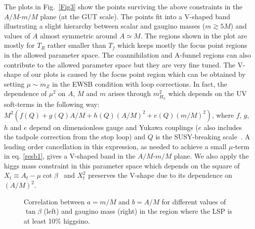 \documentclass[12pt,a4paper]{book}
\begin{document}
The plots in Fig.~\ref{Fig3} show the points surviving the above constraints in the $A/M$-$m/M$ plane (at the GUT scale). The points fit into a V-shaped band illustrating a slight hierarchy between scalar and gaugino masses ($m\gtrsim 5 M$) and values of $A$ almost symmetric around $A\simeq M$. The regions shown in the plot are mostly for $T_R$ rather smaller than $T_f$ which keeps mostly the focus point regions in the allowed parameter space. The coannihilation and A-funnel regions can also contribute to the allowed parameter space but they are very fine tuned. The V-shape of our plots is caused by the focus point region which can be obtained by setting $\mu\sim m_Z$ in the EWSB condition with loop corrections. In fact, the dependence of $\mu^2$ on $A$, $M$ and $m$ arises through $m_{H_u}^2$ which depends on the UV soft-terms in the following way: $M^2(f(Q) + g(Q) A/M+ h(Q) (A/M)^2 + e(Q) (m/M)^2)$, where $f$, $g$, $h$ and $e$ depend on dimensionless gauge and Yukawa couplings ($e$ also includes the tadpole correction from the stop loop)  and $Q$ is the SUSY-breaking scale~\cite{Feng:1999zg}. A leading order cancellation in this expression, as needed to achieve a small $\mu$-term in eq. \eqref{resb1}, gives a V-shaped band in the $A/M$-$m/M$ plane. We also apply the higgs mass constraint in this parameter space which depends on the square of $X_t\equiv A_t-\mu \cot\beta$~\cite{Carena:1995bx} and $X_t^2$ preserves the V-shape due to its dependence on $(A/M)^2$.

\begin{figure}
\centering
{} \quad
{} 
\caption{Correlation between $a=m/M$ and $b=A/M$ for different values of $\tan\beta$ (left) and gaugino mass (right) in the region where the LSP is at least 10\% higgsino.}
\label{Fig4}
\end{figure}
\end{document}
